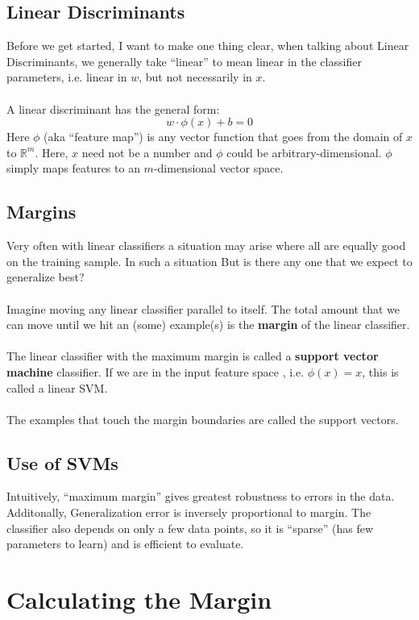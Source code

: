 \documentclass[12pt, a4paper]{book}
\begin{document}
\subsection{Linear Discriminants}
Before we get started, I want to make one thing clear, when talking about Linear Discriminants, we generally take “linear” to mean linear in the classifier parameters, i.e. linear in $w$, but not necessarily in $x$.\\\\
A linear discriminant has the general form:
$$w\cdot\phi(x) + b = 0$$
Here $\phi$ (aka “feature map”) is any vector function that goes from the domain of $x$ to $\mathbb{R}^m$. Here, $x$ need not be a number and $\phi$ could be arbitrary-dimensional. $\phi$ simply maps features to an $m$-dimensional vector space.

\subsection{Margins}
Very often with linear classifiers a situation may arise where all are equally good on the training sample. In such a situation But is there any one that we expect to generalize best?\\\\
Imagine moving any linear classifier parallel to itself. The total amount that we can move until we hit an (some) example(s) is the \textbf{margin} of the linear classifier.\\\\
The linear classifier with the maximum margin is called a \textbf{support vector machine} classifier. If we are in the input feature space , i.e.
$\phi(x)=x$, this is called a linear SVM.\\\\
The examples that touch the margin boundaries are called the support vectors.

\subsection{Use of SVMs}
Intuitively, “maximum margin” gives greatest robustness to errors in the data. Additonally, Generalization error is inversely proportional to margin. The classifier also depends on only a few data points, so it is
“sparse” (has few parameters to learn) and is efficient to evaluate.

\section{Calculating the Margin}
\end{document}

